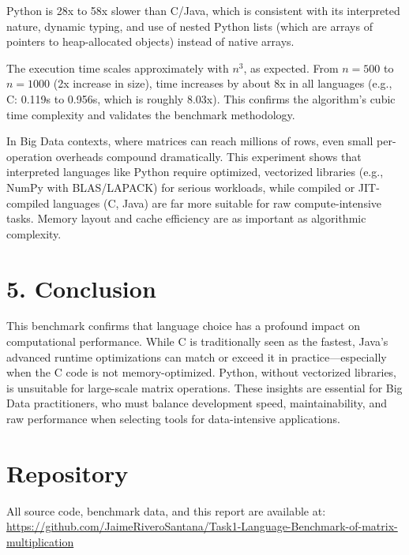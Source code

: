 \documentclass[12pt]{article}
\begin{document}
Python is 28x to 58x slower than C/Java, which is consistent with its interpreted nature, dynamic typing, and use of nested Python lists (which are arrays of pointers to heap-allocated objects) instead of native arrays.

The execution time scales approximately with $n^3$, as expected. From $n=500$ to $n=1000$ (2x increase in size), time increases by about 8x in all languages (e.g., C: 0.119s to 0.956s, which is roughly 8.03x). This confirms the algorithm's cubic time complexity and validates the benchmark methodology.

In Big Data contexts, where matrices can reach millions of rows, even small per-operation overheads compound dramatically. This experiment shows that interpreted languages like Python require optimized, vectorized libraries (e.g., NumPy with BLAS/LAPACK) for serious workloads, while compiled or JIT-compiled languages (C, Java) are far more suitable for raw compute-intensive tasks. Memory layout and cache efficiency are as important as algorithmic complexity.

\section*{5. Conclusion}
This benchmark confirms that language choice has a profound impact on computational performance. While C is traditionally seen as the fastest, Java's advanced runtime optimizations can match or exceed it in practice---especially when the C code is not memory-optimized. Python, without vectorized libraries, is unsuitable for large-scale matrix operations. These insights are essential for Big Data practitioners, who must balance development speed, maintainability, and raw performance when selecting tools for data-intensive applications.

\section*{Repository}
All source code, benchmark data, and this report are available at:  
\url{https://github.com/JaimeRiveroSantana/Task1-Language-Benchmark-of-matrix-multiplication}
\end{document}

